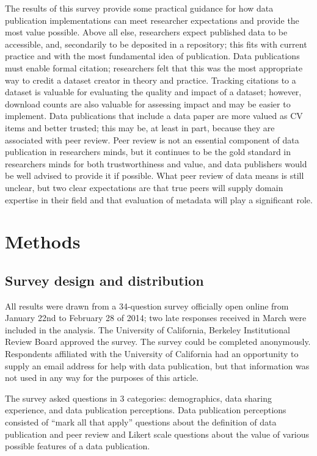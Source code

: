 \documentclass[10pt]{article}
\begin{document}
The results of this survey provide some practical guidance for how data publication implementations can meet researcher expectations and provide the most value possible.
Above all else, researchers expect published data to be accessible, and, secondarily to be deposited in a repository; this fits with current practice and with the most fundamental idea of publication.
Data publications must enable formal citation; researchers felt that this was the most appropriate way to credit a dataset creator in theory and practice.
Tracking citations to a dataset is valuable for evaluating the quality and impact of a dataset; however, download counts are also valuable for assessing impact and may be easier to implement.
Data publications that include a data paper are more valued as CV items and better trusted; this may be, at least in part, because they are associated with peer review.
Peer review is not an essential component of data publication in researchers minds, but it continues to be the gold standard in researchers minds for both trustworthiness and value, and data publishers would be well advised to provide it if possible.
What peer review of data means is still unclear, but two clear expectations are that true peers will supply domain expertise in their field and that evaluation of metadata will play a significant role.


\section*{Methods}
\subsection*{Survey design and distribution}
All results were drawn from a 34-question survey officially open online from January 22nd to February 28 of 2014; two late responses received in March were included in the analysis.
The University of California, Berkeley Institutional Review Board approved the survey.
The survey could be completed anonymously.
Respondents affiliated with the University of California had an opportunity to supply an email address for help with data publication, but that information was not used in any way for the purposes of this article.

The survey asked questions in 3 categories: demographics, data sharing experience, and data publication perceptions.
Data publication perceptions consisted of ``mark all that apply'' questions about the definition of data publication and peer review and Likert scale questions about the value of various possible features of a data publication.
\end{document}
